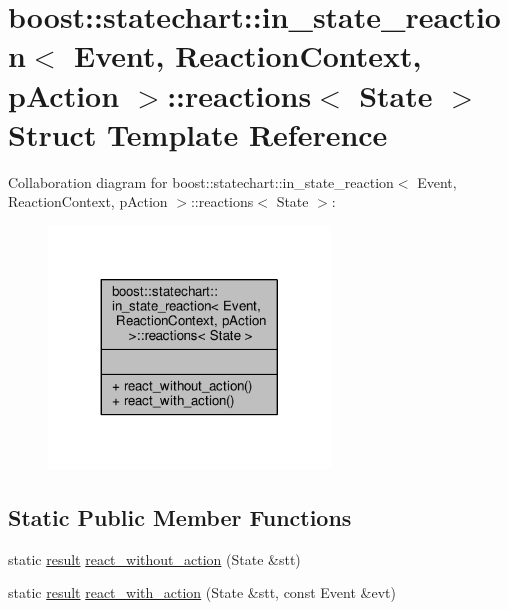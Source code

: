 \hypertarget{structboost_1_1statechart_1_1in__state__reaction_1_1reactions}{}\section{boost\+:\+:statechart\+:\+:in\+\_\+state\+\_\+reaction$<$ Event, Reaction\+Context, p\+Action $>$\+:\+:reactions$<$ State $>$ Struct Template Reference}
\label{structboost_1_1statechart_1_1in__state__reaction_1_1reactions}


Collaboration diagram for boost\+:\+:statechart\+:\+:in\+\_\+state\+\_\+reaction$<$ Event, Reaction\+Context, p\+Action $>$\+:\+:reactions$<$ State $>$\+:
\nopagebreak
\begin{figure}[H]
\begin{center}
\leavevmode
\includegraphics[width=212pt]{structboost_1_1statechart_1_1in__state__reaction_1_1reactions__coll__graph}
\end{center}
\end{figure}
\subsection*{Static Public Member Functions}
\begin{DoxyCompactItemize}
\item 
static \mbox{\hyperlink{namespaceboost_1_1statechart_abe807f6598b614d6d87bb951ecd92331}{result}} \mbox{\hyperlink{structboost_1_1statechart_1_1in__state__reaction_1_1reactions_a5f372ebea19a5082bb45bc0e42c20442}{react\+\_\+without\+\_\+action}} (State \&stt)
\item 
static \mbox{\hyperlink{namespaceboost_1_1statechart_abe807f6598b614d6d87bb951ecd92331}{result}} \mbox{\hyperlink{structboost_1_1statechart_1_1in__state__reaction_1_1reactions_a8ca803ff6ded72bc5bcdb3af319265dd}{react\+\_\+with\+\_\+action}} (State \&stt, const Event \&evt)
\end{DoxyCompactItemize}


